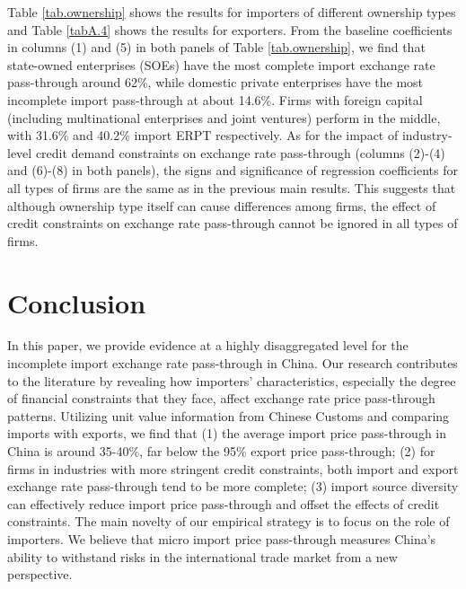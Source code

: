 \documentclass[12pt]{article}
\begin{document}
Table \ref{tab.ownership} shows the results for importers of different ownership types and Table \ref{tabA.4} shows the results for exporters. From the baseline coefficients in columns (1) and (5) in both panels of Table \ref{tab.ownership}, we find that state-owned enterprises (SOEs) have the most complete import exchange rate pass-through around 62\%, while domestic private enterprises have the most incomplete import pass-through at about 14.6\%. Firms with foreign capital (including multinational enterprises and joint ventures) perform in the middle, with 31.6\% and 40.2\% import ERPT respectively. As for the impact of industry-level credit demand constraints on exchange rate pass-through (columns (2)-(4) and (6)-(8) in both panels), the signs and significance of regression coefficients for all types of firms are the same as in the previous main results. This suggests that although ownership type itself can cause differences among firms, the effect of credit constraints on exchange rate pass-through cannot be ignored in all types of firms.

\section{Conclusion}\label{Conclusion}

In this paper, we provide evidence at a highly disaggregated level for the incomplete import exchange rate pass-through in China. Our research contributes to the literature by revealing how importers' characteristics, especially the degree of financial constraints that they face, affect exchange rate price pass-through patterns. Utilizing unit value information from Chinese Customs and comparing imports with exports, we find that (1) the average import price pass-through in China is around 35-40\%, far below the 95\% export price pass-through; (2) for firms in industries with more stringent credit constraints, both import and export exchange rate pass-through tend to be more complete; (3) import source diversity can effectively reduce import price pass-through and offset the effects of credit constraints. The main novelty of our empirical strategy is to focus on the role of importers. We believe that micro import price pass-through measures China's ability to withstand risks in the international trade market from a new perspective.
\end{document}
